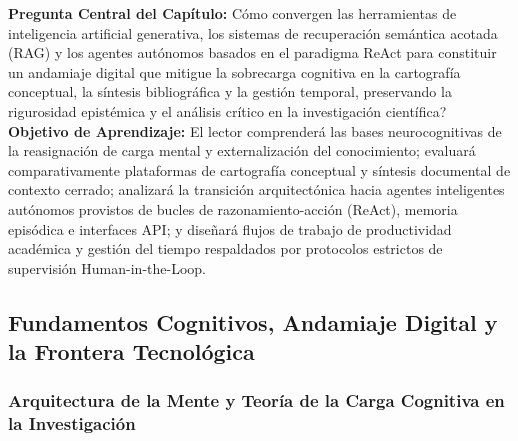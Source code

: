 \begin{cajabeige}
\textbf{Pregunta Central del Capítulo:} \textquestiondown Cómo convergen las herramientas de inteligencia artificial generativa, los sistemas de recuperación semántica acotada (RAG) y los agentes autónomos basados en el paradigma ReAct para constituir un andamiaje digital que mitigue la sobrecarga cognitiva en la cartografía conceptual, la síntesis bibliográfica y la gestión temporal, preservando la rigurosidad epistémica y el análisis crítico en la investigación científica?\\[0.3cm]
\textbf{Objetivo de Aprendizaje:} El lector comprenderá las bases neurocognitivas de la reasignación de carga mental y externalización del conocimiento; evaluará comparativamente plataformas de cartografía conceptual y síntesis documental de contexto cerrado; analizará la transición arquitectónica hacia agentes inteligentes autónomos provistos de bucles de razonamiento-acción (ReAct), memoria episódica e interfaces API; y diseñará flujos de trabajo de productividad académica y gestión del tiempo respaldados por protocolos estrictos de supervisión Human-in-the-Loop.
\end{cajabeige}


\vspace{0.4cm}

\subsection{Fundamentos Cognitivos, Andamiaje Digital y la Frontera Tecnológica}

\subsubsection{Arquitectura de la Mente y Teoría de la Carga Cognitiva en la Investigación}

